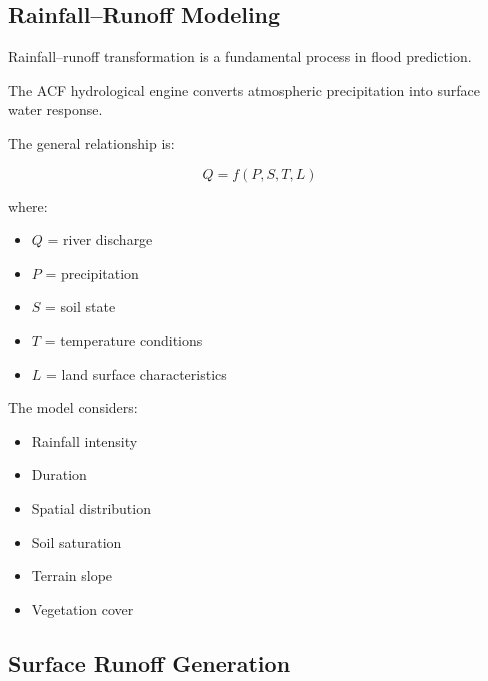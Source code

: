 \subsection{Rainfall--Runoff Modeling}

Rainfall--runoff transformation is a fundamental process in flood
prediction.

The ACF hydrological engine converts atmospheric precipitation into
surface water response.

The general relationship is:

\[
Q=f(P,S,T,L)
\]

where:

\begin{itemize}

\item $Q$ = river discharge

\item $P$ = precipitation

\item $S$ = soil state

\item $T$ = temperature conditions

\item $L$ = land surface characteristics

\end{itemize}


The model considers:

\begin{itemize}

\item Rainfall intensity

\item Duration

\item Spatial distribution

\item Soil saturation

\item Terrain slope

\item Vegetation cover

\end{itemize}



\subsection{Surface Runoff Generation}

